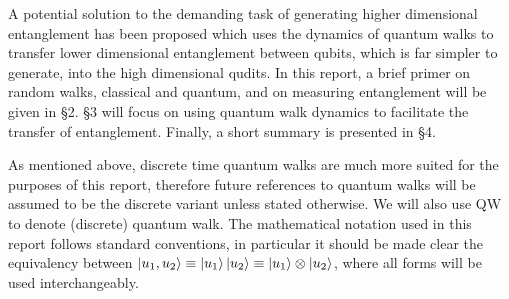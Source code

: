 A potential solution to the demanding task of generating higher dimensional entanglement has been proposed \cite{giordani2020} which uses the dynamics of quantum walks to transfer lower dimensional entanglement between qubits, which is far simpler to generate, into the high dimensional qudits. 
In this report, a brief primer on random walks, classical and quantum, and on measuring entanglement will be given in \S{2}. 
\S{3} will focus on using quantum walk dynamics to facilitate the transfer of entanglement.
Finally, a short summary is presented in \S{4}.\newline

As mentioned above, discrete time quantum walks are much more suited for the purposes of this report, therefore future references to quantum walks will be assumed to be the discrete variant unless stated otherwise. 
We will also use QW to denote (discrete) quantum walk. 
The mathematical notation used in this report follows standard conventions, in particular it should be made clear the equivalency between $\ket{u_1, u_2}\equiv\ket{u_1}\ket{u_2} \equiv \ket{u_1} \otimes \ket{u_2}$, where all forms will be used interchangeably.